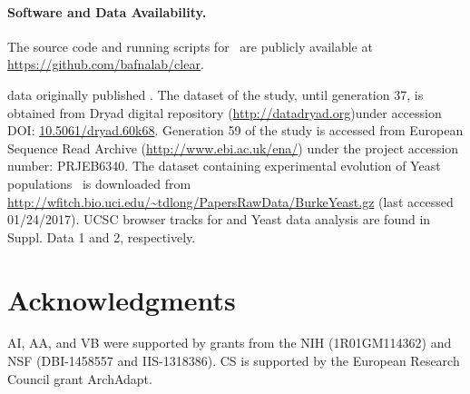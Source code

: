 \paragraph{Software and Data Availability.}

The source code and running scripts for \comale\ are publicly available at 
\url{https://github.com/bafnalab/clear}. 

\dmel data originally published 
\cite{orozco2012adaptation,franssen2015patterns}. The dataset of the 
\dmel study, until generation 37, is obtained from Dryad 
digital repository (\url{http://datadryad.org})under 
accession DOI: 
\href{http://datadryad.org/resource/doi:10.5061/dryad.60k68}{10.5061/dryad.60k68}.
Generation 59 of the \dmel study is accessed from
  European Sequence Read Archive 
  (\href{http://www.ebi.ac.uk/ena/}{http://www.ebi.ac.uk/ena/})  under 
  the 
  project accession number: PRJEB6340.
The dataset containing experimental evolution of Yeast 
populations~\cite{burke2014standing} is 
downloaded from 
\url{http://wfitch.bio.uci.edu/~tdlong/PapersRawData/BurkeYeast.gz}
(last accessed 01/24/2017). 
UCSC browser tracks for \dmel and Yeast data analysis are found in Suppl. Data 
1 and 2, respectively.
\section*{Acknowledgments}
AI, AA, and VB were supported by grants from the NIH (1R01GM114362) and
NSF (DBI-1458557 and IIS-1318386). CS is supported by the European Research 
Council grant ArchAdapt.
